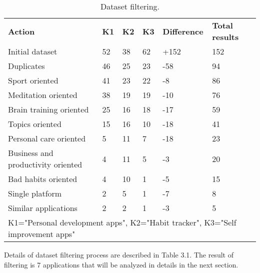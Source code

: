\begin{table}[t!]
    \centering
    \begin{adjustbox}{width=\textwidth}
        \begin{ctucolortab}
            \begin{tabular}{llllll}
                \bfseries Action & \bfseries K1 & \bfseries K2 & \bfseries K3 & \bfseries Difference & \bfseries Total results \\\Midrule
                Initial dataset & 52 & 38 & 62 & +152 & 152\\
                Duplicates & 46 & 25 & 23 & -58 & 94\\
                Sport oriented & 41 & 23 & 22 & -8 & 86\\
                Meditation oriented & 38 & 19 & 19 & -10 & 76\\
                Brain training oriented & 25 & 16 & 18 & -17 & 59\\
                Topics oriented & 15 & 16 & 10 & -18 & 41\\
                Personal care oriented & 5 & 11 & 7 & -18 & 23\\
                Business and productivity oriented & 4 & 11 & 5 & -3 & 20\\
                Bad habits oriented & 4 & 10 & 1 & -5 & 15\\
                Single platform & 2 & 5 & 1 & -7 & 8\\
                Similar applications & 2 & 2 & 1 & -3 & 5\\
                \bottomrule
                \multicolumn{6}{1}{K1="Personal development apps", K2="Habit tracker", K3="Self improvement apps"}
            \end{tabular}
        \end{ctucolortab}
    \end{adjustbox}
    \caption{Dataset filtering.}
    \label{tab:dataset-filtering}
\end{table}

Details of dataset filtering process are described in Table 3.1.
The result of filtering is 7 applications that will be analyzed in details in the next section.
